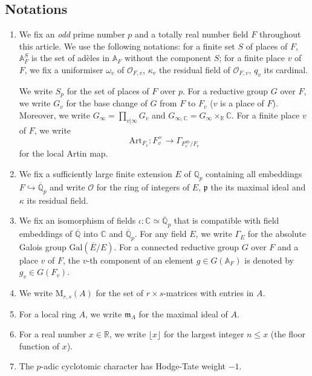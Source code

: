 \documentclass[12pt,oneside,reqno]{amsart}
\newcommand{\C}{\mathbb{C}}
\newcommand{\R}{\mathbb{R}}
\theoremstyle{plain}
\begin{document}
	\subsection*{Notations}
	\begin{enumerate}
		\item We fix an \emph{odd} prime number $p$	and a totally real number field	$F$ throughout this article. We use the following notations: for a finite set $S$ of places of $F$, $\mathbb{A}_F^S$ is the set of adèles in $\mathbb{A}_F$
		without the component $S$; for a finite place $v$ of $F$, we fix a uniformiser $\omega_v$ of $\mathcal{O}_{F,v}$, $\kappa_v$ the residual field of $\mathcal{O}_{F,v}$, $q_v$ its cardinal.
		
		
		
		
		
		We write $S_p$ for the set of places of $F$ over $p$. For a reductive group $G$ over $F$, we write $G_v$ for the base change of $G$ from $F$ to $F_v$ ($v$ is a place of $F$). Moreover, we write $G_\infty=\prod_{v|\infty}G_v$ and $G_{\infty,\C}=G_\infty\times_\R\C$. For a finite place $v$ of $F$, we write
		\[
		\mathrm{Art}_{F_v}
		\colon
		F_v^\times\to\Gamma_{F_v^\mathrm{ab}/F_v}
		\]
		for the local Artin map.
		
		\item We fix a sufficiently large finite extension $E$ of $\mathbb{Q}_p$
		containing all embeddings $F\hookrightarrow\overline{\mathbb{Q}}_p$
		and write $\mathcal{O}$ for the ring of integers of $E$, $\mathfrak{p}$
		the its maximal ideal and $\kappa$ its residual field.
		
		
		\item We fix an isomorphism of fields
		$\iota\colon\mathbb{C}\simeq\overline{\mathbb{Q}}_p$ that is compatible with field embeddings of $\overline{\mathbb{Q}}$ into $\mathbb{C}$ and $\overline{\mathbb{Q}}_p$. For any field $E$, we write $\Gamma_E$
		for the absolute Galois group $\mathrm{Gal}(\overline{E}/E)$. For a connected reductive group $G$ over $F$ and a place $v$ of $F$, the $v$-th component of an element	$g\in G(\mathbb{A}_F)$ is denoted by $g_v\in G(F_v)$.
		
		\item We write $\mathrm{M}_{r,s}(A)$ for the set of $r\times s$-matrices with entries in $A$.
		
		\item For a local ring $A$, we write $\mathfrak{m}_A$ for the maximal ideal of $A$.
		
		
		\item 
		For a real number $x\in\R$, we write $\lfloor x\rfloor$ for the largest integer $n\leq x$ (the floor function of $x$).
		
		
		\item 
		The $p$-adic cyclotomic character has Hodge-Tate weight $-1$.
	\end{enumerate}
	
\end{document}
